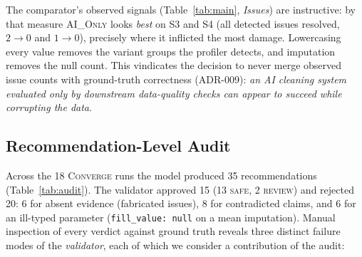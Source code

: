 The comparator's observed signals (Table~\ref{tab:main}, \emph{Issues}) are instructive: by that measure \textsc{AI\_Only} looks \emph{best} on S3 and S4 (all detected issues resolved, $2\to0$ and $1\to0$), precisely where it inflicted the most damage. Lowercasing every value removes the variant groups the profiler detects, and imputation removes the null count. This vindicates the decision to never merge observed issue counts with ground-truth correctness (ADR-009): \emph{an AI cleaning system evaluated only by downstream data-quality checks can appear to succeed while corrupting the data}.

\subsection{Recommendation-Level Audit}
\label{sec:res-audit}
Across the 18 \textsc{Converge} runs the model produced 35 recommendations (Table~\ref{tab:audit}). The validator approved 15 (13 \textsc{safe}, 2 \textsc{review}) and rejected 20: 6 for absent evidence (fabricated issues), 8 for contradicted claims, and 6 for an ill-typed parameter (\texttt{fill\_value: null} on a mean imputation). Manual inspection of every verdict against ground truth reveals three distinct failure modes of the \emph{validator}, each of which we consider a contribution of the audit:

